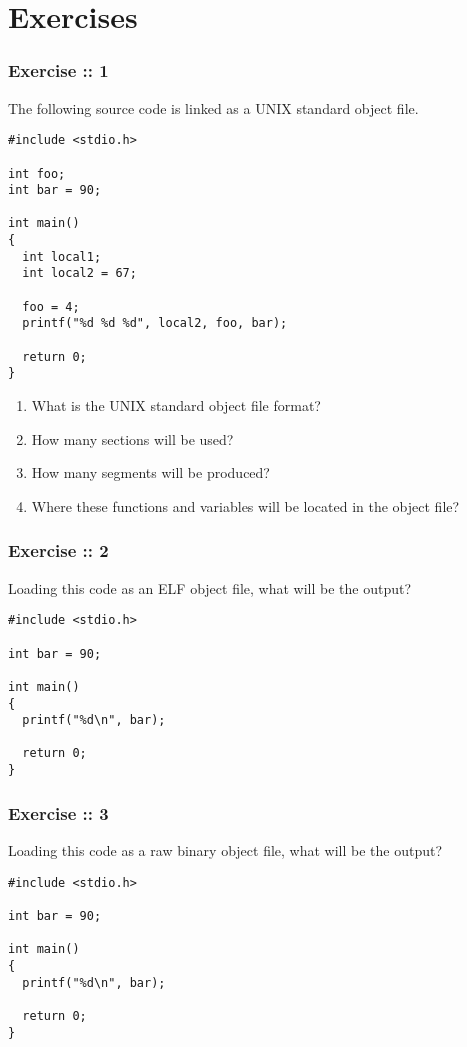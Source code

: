 %
%

\section{Exercises}


\begin{frame}[containsverbatim]
  \frametitle{Exercise :: 1}

The following source code is linked as a UNIX standard object file.

\begin{verbatim}
#include <stdio.h>

int foo;
int bar = 90;

int main()
{
  int local1;
  int local2 = 67;

  foo = 4;
  printf("%d %d %d", local2, foo, bar);

  return 0;
}
\end{verbatim}

\begin{enumerate}
    \item
    What is the UNIX standard object file format?
    \item
    How many sections will be used?
    \item
    How many segments will be produced?
    \item
    Where these functions and variables will be located in the object file?
   \end{enumerate}

\end{frame}


\begin{frame}[containsverbatim]
  \frametitle{Exercise :: 2}

Loading this code as an ELF object file, what will be the output?

\begin{verbatim}
#include <stdio.h>

int bar = 90;

int main()
{
  printf("%d\n", bar);

  return 0;
}
\end{verbatim}


\end{frame}


\begin{frame}[containsverbatim]
  \frametitle{Exercise :: 3}

Loading this code as a raw binary object file, what will be the output?

\begin{verbatim}
#include <stdio.h>

int bar = 90;

int main()
{
  printf("%d\n", bar);

  return 0;
}
\end{verbatim}

\end{frame}




